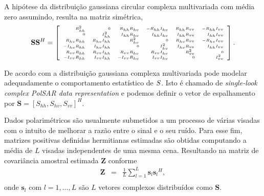 A hipótese da distribuição gaussiana circular complexa multivariada com média zero assumindo, resulta na matriz simétrica,  
\begin{equation*}
\tiny
\mathbf{S} \mathbf{S}^H= \left[
\begin{array}{rrrrrr}
	R_{hh}^2       & 0            & R_{hh}R_{hv}  &-R_{hh}I_{hv}  &R_{hh}R_{vv}  &-R_{hh}I_{vv}    \\
    0              & I_{hh}^2     & I_{hh}R_{hv}  & I_{hh}I_{hv}  &I_{hh}R_{vv}  & I_{hh}I_{vv}   \\
	R_{hv}R_{hh}   & R_{hv}I_{hh} & R_{hv}^2      & 0             &R_{hv}R_{vv}  &-R_{hv}I_{vv}     \\
   -I_{hv}R_{hh}   & I_{hv}I_{hh} & 0             & I_{hv}^2      &I_{hv}R_{vv}  & I_{hh}I_{vv} \\
    R_{vv}R_{hh}   & R_{vv}I_{hh} & R_{vv}R_{hv}  & R_{vv}I_{hv}  &R_{vv}^2      & 0            \\
   -I_{vv}R_{hh}   & I_{vv}I_{hh} &-I_{vv}R_{hv}  & I_{vv}I_{hv}  &0             & I_{vv}^2     \\
\end{array}
\right].
\end{equation*}

De acordo com \cite{good} a distribuição gaussiana complexa multivariada pode modelar adequadamente o comportamento estatístico de $\boldmath S$. Isto é chamado de {\it single-look complex PolSAR data representation} e podemos definir o vetor de espalhamento por $\mathbf{S}=[S_{hh},S_{hv},S_{vv}]^H$. 

Dados polarimétricos são usualmente submetidos a um processo de várias visadas com o intuito de melhorar a razão entre o sinal e o seu ruído. Para esse fim, matrizes positivas definidas hermitianas estimadas são obtidas computando a média de $L$ visadas independentes de uma mesma cena. Resultando na matriz de covariância amostral estimada \textbf{Z} conforme \cite{good, ade}
\begin{equation}
\begin{array}{ccc}
    \mathbf{Z}&=&\frac{1}{L}\displaystyle{\sum_{l=1}^{L} {\mathbf{s}_l}{\mathbf{s}_l}^H}, \\
\end{array}
\end{equation}
onde $\mathbf{s}_l$ com $l = 1, \dots, L$ são $L$ vetores complexos distribuídos como $\mathbf{S}$.

